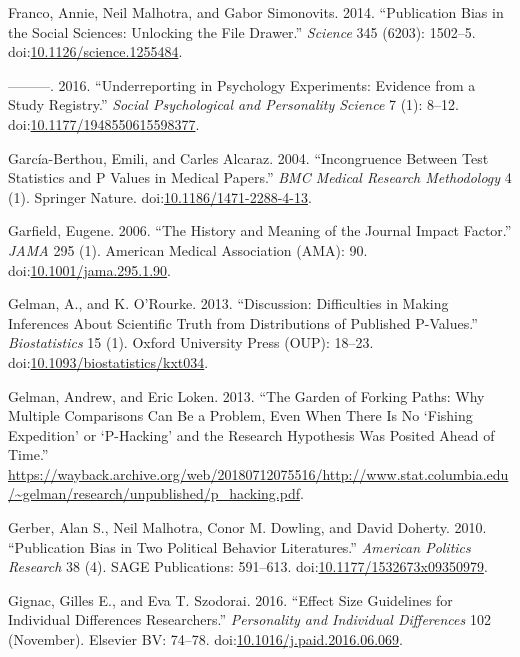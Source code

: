 \documentclass[a5paper]{book}
\begin{document}
\hypertarget{ref-doi:10.1126ux2fscience.1255484}{}
Franco, Annie, Neil Malhotra, and Gabor Simonovits. 2014. ``Publication
Bias in the Social Sciences: Unlocking the File Drawer.'' \emph{Science}
345 (6203): 1502--5.
doi:\href{https://doi.org/10.1126/science.1255484}{10.1126/science.1255484}.

\hypertarget{ref-doi:10.1177ux2f1948550615598377}{}
---------. 2016. ``Underreporting in Psychology Experiments: Evidence
from a Study Registry.'' \emph{Social Psychological and Personality
Science} 7 (1): 8--12.
doi:\href{https://doi.org/10.1177/1948550615598377}{10.1177/1948550615598377}.

\hypertarget{ref-doi:10.1186ux2f1471-2288-4-13}{}
García-Berthou, Emili, and Carles Alcaraz. 2004. ``Incongruence Between
Test Statistics and P Values in Medical Papers.'' \emph{BMC Medical
Research Methodology} 4 (1). Springer Nature.
doi:\href{https://doi.org/10.1186/1471-2288-4-13}{10.1186/1471-2288-4-13}.

\hypertarget{ref-doi:10.1001ux2fjama.295.1.90}{}
Garfield, Eugene. 2006. ``The History and Meaning of the Journal Impact
Factor.'' \emph{JAMA} 295 (1). American Medical Association (AMA): 90.
doi:\href{https://doi.org/10.1001/jama.295.1.90}{10.1001/jama.295.1.90}.

\hypertarget{ref-doi:10.1093ux2fbiostatisticsux2fkxt034}{}
Gelman, A., and K. O'Rourke. 2013. ``Discussion: Difficulties in Making
Inferences About Scientific Truth from Distributions of Published
P-Values.'' \emph{Biostatistics} 15 (1). Oxford University Press (OUP):
18--23.
doi:\href{https://doi.org/10.1093/biostatistics/kxt034}{10.1093/biostatistics/kxt034}.

\hypertarget{ref-gelman-forking}{}
Gelman, Andrew, and Eric Loken. 2013. ``The Garden of Forking Paths: Why
Multiple Comparisons Can Be a Problem, Even When There Is No `Fishing
Expedition' or `P-Hacking' and the Research Hypothesis Was Posited Ahead
of Time.''
\url{https://wayback.archive.org/web/20180712075516/http://www.stat.columbia.edu/~gelman/research/unpublished/p_hacking.pdf}.

\hypertarget{ref-doi:10.1177ux2f1532673x09350979}{}
Gerber, Alan S., Neil Malhotra, Conor M. Dowling, and David Doherty.
2010. ``Publication Bias in Two Political Behavior Literatures.''
\emph{American Politics Research} 38 (4). SAGE Publications: 591--613.
doi:\href{https://doi.org/10.1177/1532673x09350979}{10.1177/1532673x09350979}.

\hypertarget{ref-doi:10.1016ux2fj.paid.2016.06.069}{}
Gignac, Gilles E., and Eva T. Szodorai. 2016. ``Effect Size Guidelines
for Individual Differences Researchers.'' \emph{Personality and
Individual Differences} 102 (November). Elsevier BV: 74--78.
doi:\href{https://doi.org/10.1016/j.paid.2016.06.069}{10.1016/j.paid.2016.06.069}.
\end{document}
